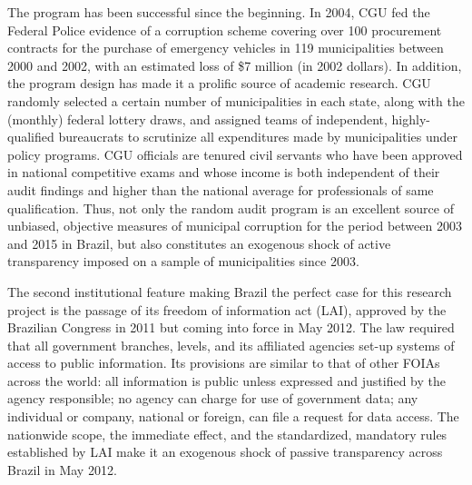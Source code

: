 \documentclass[11pt]{article}
\begin{document}
The program has been successful since the beginning. In 2004, CGU fed the Federal Police evidence of a corruption scheme covering over 100 procurement contracts for the purchase of emergency vehicles in 119 municipalities between 2000 and 2002, with an estimated loss of \$7 million (in 2002 dollars). In addition, the program design has made it a prolific source of academic research. CGU randomly selected a certain number of municipalities in each state, along with the (monthly) federal lottery draws, and assigned teams of independent, highly-qualified bureaucrats to scrutinize all expenditures made by municipalities under policy programs. CGU officials are tenured civil servants who have been approved in national competitive exams and whose income is both independent of their audit findings and higher than the national average for professionals of same qualification. Thus, not only the random audit program is an excellent source of unbiased, objective measures of municipal corruption for the period between 2003 and 2015 in Brazil, but also constitutes an exogenous shock of active transparency imposed on a sample of municipalities since 2003.

The second institutional feature making Brazil the perfect case for this research project is the passage of its freedom of information act (LAI), approved by the Brazilian Congress in 2011 but coming into force in May 2012. The law required that all government branches, levels, and its affiliated agencies set-up systems of access to public information. Its provisions are similar to that of other FOIAs across the world: all information is public unless expressed and justified by the agency responsible; no agency can charge for use of government data; any individual or company, national or foreign, can file a request for data access. The nationwide scope, the immediate effect, and the standardized, mandatory rules established by LAI make it an exogenous shock of passive transparency across Brazil in May 2012.
\end{document}
